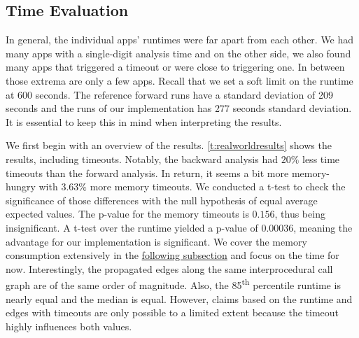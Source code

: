 \documentclass[../draft.tex]{subfiles}
\begin{document}
    \FloatBarrier
    \subsection{Time Evaluation}
    In general, the individual apps' runtimes were far apart from each other.
    We had many apps with a single-digit analysis time and on the other side, we also found many apps that triggered a timeout or were close to triggering one.
    In between those extrema are only a few apps.
    Recall that we set a soft limit on the runtime at 600 seconds.
    The reference forward runs have a standard deviation of 209 seconds and the runs of our implementation has 277 seconds standard deviation.
    It is essential to keep this in mind when interpreting the results.

    We first begin with an overview of the results.
    \autoref{t:realworldresults} shows the results, including timeouts.
    Notably, the backward analysis had $20\%$ less time timeouts than the forward analysis.
    In return, it seems a bit more memory-hungry with $3.63\%$ more memory timeouts.
    We conducted a t-test to check the significance of those differences with the null hypothesis of equal average expected values.
    The p-value for the memory timeouts is $0.156$, thus being insignificant.
    A t-test over the runtime yielded a p-value of $0.00036$, meaning the advantage for our implementation is significant.
    We cover the memory consumption extensively in the \hyperref[s:memex]{following subsection} and focus on the time for now.
    Interestingly, the propagated edges along the same interprocedural call graph are of the same order of magnitude.
    Also, the 85\textsuperscript{th} percentile runtime is nearly equal and the median is equal.
    However, claims based on the runtime and edges with timeouts are only possible to a limited extent because the timeout highly influences both values.
\end{document}
